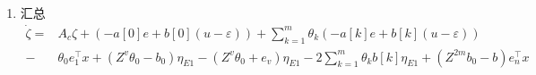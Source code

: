 \documentclass[a4paper,12pt]{article}
\begin{document}
\begin{enumerate}
\begin{align*}
         = 
        \sum_{\ell=1}^{m} \theta_{\ell}Z^{2\ell} 
        \begin{bmatrix}I_{v} \\ 0 \end{bmatrix} 
        b_0 (u-\varepsilon)
        \\ = &
        \sum_{\ell=1}^{m} \theta_{\ell} b[\ell] (u-\varepsilon)
    \end{align*}
    \item 汇总
    \begin{align*}
        \dot{\zeta}  = & 
        A_c \zeta + \left(-a[0]e+b[0](u-\varepsilon)\right) + 
        \sum_{k=1}^{m} \theta_{k} \left(-a[k]e + b[k](u-\varepsilon)\right) 
        \\ - &
        {\theta_0}e_1^\top x
        +(Z^v{\theta_0}-{b_0})\eta_{E1}
        - (Z^v{\theta_0}+e_v)\eta_{E1}
        - 2\sum_{k=1}^{m} \theta_k b[k]\eta_{E1}
        +(Z^{2m}{b_0}-{b})e_n^\top x
    \end{align*}
\end{enumerate}

\end{document}
